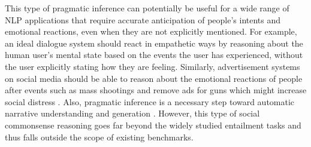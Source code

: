 \documentclass[11pt,a4paper]{article}
\begin{document}
This type of pragmatic inference can potentially be useful for a wide range of NLP applications that require accurate anticipation of people's intents and emotional reactions, even when they are not explicitly mentioned. 
For example, an ideal dialogue system should react in empathetic ways by reasoning about the human user's mental state based on the events the user has experienced, without the user explicitly stating how they are feeling. 
Similarly, advertisement systems on social media should be able to reason about the emotional reactions of people after events such as mass shootings and remove ads for guns which might increase social distress \cite{FacebookGuns}. Also, pragmatic inference is a necessary step toward automatic narrative understanding and generation \cite{tomai2010using,AffectiveEvents,WhyAffect}.
However, this type of social commonsense reasoning goes far beyond the widely studied entailment tasks \cite{SNLI,dagan2006pascal} and thus falls outside the scope of existing benchmarks.
\end{document}
